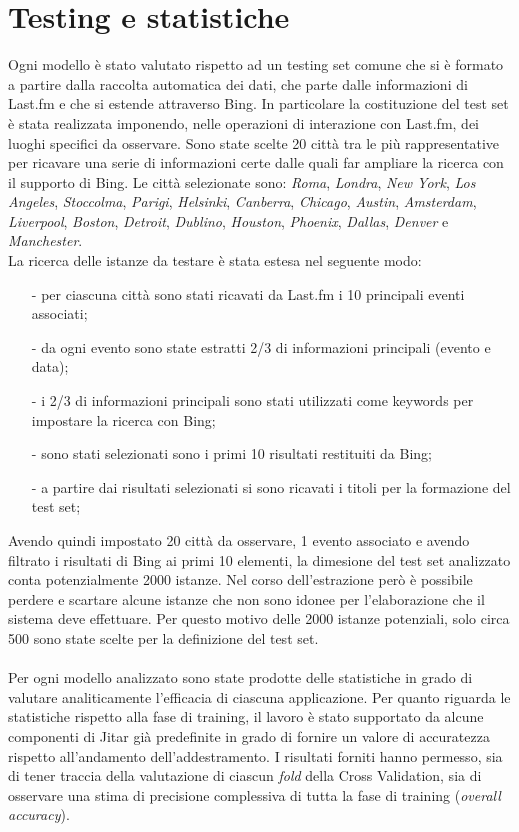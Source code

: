 \documentclass[a4paper]{report}
\begin{document}
\section{Testing e statistiche}
Ogni modello è stato valutato rispetto ad un testing set comune che si è formato a partire dalla raccolta automatica dei dati, che parte dalle informazioni di Last.fm e che si estende attraverso Bing. In particolare la costituzione del test set è stata realizzata imponendo, nelle operazioni di interazione con Last.fm, dei luoghi specifici da osservare. Sono state scelte 20 città tra le più rappresentative per ricavare una serie di informazioni certe dalle quali far ampliare la ricerca con il supporto di Bing. Le città selezionate sono: \textit{Roma}, \textit{Londra}, \textit{New York}, \textit{Los Angeles}, \textit{Stoccolma}, \textit{Parigi}, \textit{Helsinki}, \textit{Canberra}, \textit{Chicago}, \textit{Austin}, \textit{Amsterdam}, \textit{Liverpool}, \textit{Boston}, \textit{Detroit}, \textit{Dublino}, \textit{Houston}, \textit{Phoenix}, \textit{Dallas}, \textit{Denver} e \textit{Manchester}. \\
La ricerca delle istanze da testare è stata estesa nel seguente modo:
\begin{itemize}
\item[\--] per ciascuna città sono stati ricavati da Last.fm i 10 principali eventi associati;
\item[\--] da ogni evento sono state estratti 2/3 di informazioni principali (evento e data);
\item[\--] i 2/3 di informazioni principali sono stati utilizzati come keywords per impostare la ricerca con Bing;
\item[\--] sono stati selezionati sono i primi 10 risultati restituiti da Bing;
\item[\--] a partire dai risultati selezionati si sono ricavati i titoli per la formazione del test set;
\end{itemize}
Avendo quindi impostato 20 città da osservare, 1 evento associato e avendo filtrato i risultati di Bing ai primi 10 elementi, la dimesione del test set analizzato conta potenzialmente 2000 istanze. Nel corso dell'estrazione però è possibile perdere e scartare alcune istanze che non sono idonee per l'elaborazione che il sistema deve effettuare. Per questo motivo delle 2000 istanze potenziali, solo circa 500 sono state scelte per la definizione del test set. \\
\\
Per ogni modello analizzato sono state prodotte delle statistiche in grado di valutare analiticamente l'efficacia di ciascuna applicazione. Per quanto riguarda le statistiche rispetto alla fase di training, il lavoro è stato supportato da alcune componenti di Jitar già predefinite in grado di fornire un valore di accuratezza rispetto all'andamento dell'addestramento. I risultati forniti hanno permesso, sia di tener traccia della valutazione di ciascun \textit{fold} della Cross Validation, sia di osservare una stima di precisione complessiva di tutta la fase di training (\textit{overall accuracy}). \\
\end{document}
